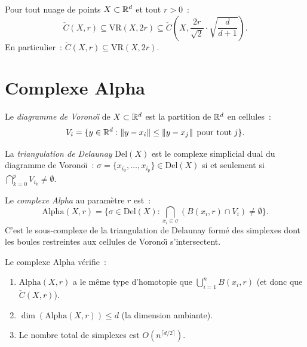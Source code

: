 \begin{proposition}
Pour tout nuage de points $X \subset \mathbb{R}^d$ et tout $r > 0$~:
\[
  \check{C}(X, r) \subseteq \mathrm{VR}(X, 2r) \subseteq
  \check{C}\left(X, \frac{2r}{\sqrt{2}} \cdot \sqrt{\frac{d}{d+1}}\right).
\]
En particulier~: $\check{C}(X, r) \subseteq \mathrm{VR}(X, 2r)$.
\end{proposition}

\section{Complexe Alpha}

\begin{definition}
Le \emph{diagramme de Vorono\"{\i}} de $X \subset \mathbb{R}^d$ est la
partition de $\mathbb{R}^d$ en cellules~:
\[
  V_i = \{y \in \mathbb{R}^d : \left\| y - x_i \right\| \leq \left\| y - x_j \right\|
  \;\text{pour tout}\; j\}.
\]
\end{definition}

\begin{definition}
La \emph{triangulation de Delaunay} $\mathrm{Del}(X)$ est le complexe
simplicial dual du diagramme de Vorono\"{\i}~:
$\sigma = \{x_{i_0}, \ldots, x_{i_p}\} \in \mathrm{Del}(X)$ si et
seulement si $\bigcap_{k=0}^p V_{i_k} \neq \emptyset$.
\end{definition}

\begin{definition}
Le \emph{complexe Alpha} au param\`etre $r$ est~:
\[
  \mathrm{Alpha}(X, r) = \big\{
    \sigma \in \mathrm{Del}(X) :
    \bigcap_{x_i \in \sigma} (B(x_i, r) \cap V_i) \neq \emptyset
  \big\}.
\]
C'est le sous-complexe de la triangulation de Delaunay form\'e des
simplexes dont les boules restreintes aux cellules de Vorono\"{\i}
s'intersectent.
\end{definition}

\begin{theoreme}[Edelsbrunner, 1995]
Le complexe Alpha v\'erifie~:
\begin{enumerate}
  \item $\mathrm{Alpha}(X, r)$ a le m\^eme type d'homotopie que
        $\bigcup_{i=1}^n B(x_i, r)$ (et donc que $\check{C}(X, r)$).
  \item $\dim(\mathrm{Alpha}(X, r)) \leq d$ (la dimension ambiante).
  \item Le nombre total de simplexes est $O(n^{\lceil d/2 \rceil})$.
\end{enumerate}
\end{theoreme}

